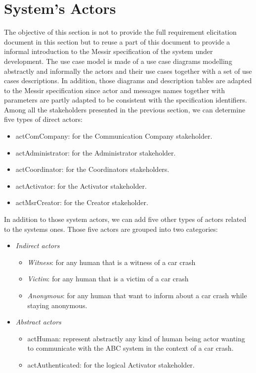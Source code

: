 \section{System's Actors}
The objective of this section is not to provide the full requirement elicitation
document in this section but to reuse a part of this document to provide a
informal introduction to the Messir specification of the system under
development. The use case model is made of a use case diagrams modelling
abstractly and informally the actors and their use cases together with a set of
use cases descriptions. In addition, those diagrams and description tables are
adapted to the Messir specification since actor and messages names together with
parameters are partly adapted to be consistent with the specification
identifiers. Among all the stakeholders presented in the previous section, we
can determine five types of direct actors:
\begin{itemize}
	\item actComCompany: for the Communication Company stakeholder.
	\item actAdministrator: for the Administrator stakeholder.
	\item actCoordinator: for the Coordinators stakeholders.
	\item actActivator: for the Activator stakeholder.
	\item actMsrCreator: for the Creator stakeholder.
\end{itemize}
In addition to those system actors, we can add five other types of actors
related to the systems ones. Those five actors are grouped into two categories:
\begin{itemize}
	\item \textit{Indirect actors}
		\begin{itemize}
			\item \textit{Witness}: for any human that is a witness of a car crash
			\item \textit{Victim}: for any human that is a victim of a car crash
			\item \textit{Anonymous}: for any human that want to inform about a car crash
			while staying anonymous.
		\end{itemize}
	\item \textit{Abstract actors}
		\begin{itemize}
			\item actHuman: represent abstractly any kind of human being actor wanting to
			communicate with the ABC system in the context of a car crash.
			\item actAuthenticated: for the logical Activator stakeholder.
		\end{itemize}
\end{itemize}
